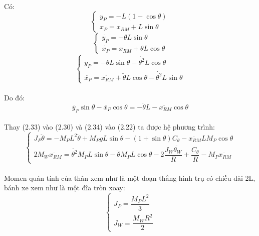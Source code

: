 \paragraph{}Có:
\begin{equation}
\begin{cases}
y_{P} = -L(1-\cos{\theta})\\
x_{P} = x_{RM} + L\sin{\theta}
\end{cases}
\end{equation}
\begin{equation}
\begin{cases}
\dot{y_{P}} = -\theta L\sin{\theta}\\
\dot{x_{P}} = \dot{x_{RM}} + \theta L\cos{\theta}
\end{cases}
\end{equation}
\begin{equation}
\begin{cases}
\ddot{y_{P}} = -\ddot{\theta} L\sin{\theta} - \dot{\theta^{2}} L\cos{\theta}\\
\ddot{x_{P}} = \ddot{x_{RM}} + \ddot{\theta} L\cos{\theta} - \dot{\theta^{2}} L\sin{\theta}
\end{cases}
\end{equation}
\paragraph{}Do đó:
\begin{equation}
\ddot{y_{P}}\sin{\theta} - \ddot{x_{P}}\cos{\theta} = -\ddot{\theta}L - \ddot{x_{RM}}\cos{\theta}
\end{equation}
\paragraph{}Thay (2.33) vào (2.30) và (2.34) vào (2.22) ta được hệ phương trình:
\begin{equation}
\begin{cases}
J_{P}\ddot{\theta} = -M_{P}L^{2}\ddot{\theta} + M_{P}gL\sin{\theta} - (1 + \sin{\theta})C_{\theta} -\ddot{x_{RM}}LM_{P}\cos{\theta}\\
2M_{W}\ddot{x_{RM}} = \dot{\theta^{2}}M_{P}L\sin{\theta} - \ddot{\theta}M_{P}L\cos{\theta} - 2\dfrac{J_{W}\ddot{\theta_{W}}}{R} + \dfrac{C_{\theta}}{R} - M_{P}\ddot{x_{RM}}
\end{cases}
\end{equation}
\paragraph{}Momen quán tính của thân xem như là một đoạn thẳng hình trụ có chiều dài 2L, bánh xe xem như là một đĩa tròn xoay:
\begin{equation}
\begin{cases}
J_{P} = \dfrac{M_{P}L^{2}}{3}\\
J_{W} = \dfrac{M_{W}R^{2}}{2}
\end{cases}
\end{equation}
